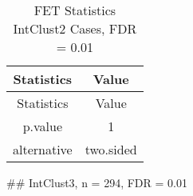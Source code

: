 \documentclass[]{article}
\begin{document}
\begin{longtable}[]{@{}cc@{}}
\caption{FET Statistics IntClust2 Cases, FDR = 0.01}\tabularnewline
\toprule
\begin{minipage}[b]{0.18\columnwidth}\centering\strut
Statistics\strut
\end{minipage} & \begin{minipage}[b]{0.14\columnwidth}\centering\strut
Value\strut
\end{minipage}\tabularnewline
\midrule
\endfirsthead
\toprule
\begin{minipage}[b]{0.18\columnwidth}\centering\strut
Statistics\strut
\end{minipage} & \begin{minipage}[b]{0.14\columnwidth}\centering\strut
Value\strut
\end{minipage}\tabularnewline
\midrule
\endhead
\begin{minipage}[t]{0.18\columnwidth}\centering\strut
p.value\strut
\end{minipage} & \begin{minipage}[t]{0.14\columnwidth}\centering\strut
1\strut
\end{minipage}\tabularnewline
\begin{minipage}[t]{0.18\columnwidth}\centering\strut
alternative\strut
\end{minipage} & \begin{minipage}[t]{0.14\columnwidth}\centering\strut
two.sided\strut
\end{minipage}\tabularnewline
\bottomrule
\end{longtable}

\pagebreak
\#\# IntClust3, n = 294, FDR = 0.01
\end{document}
